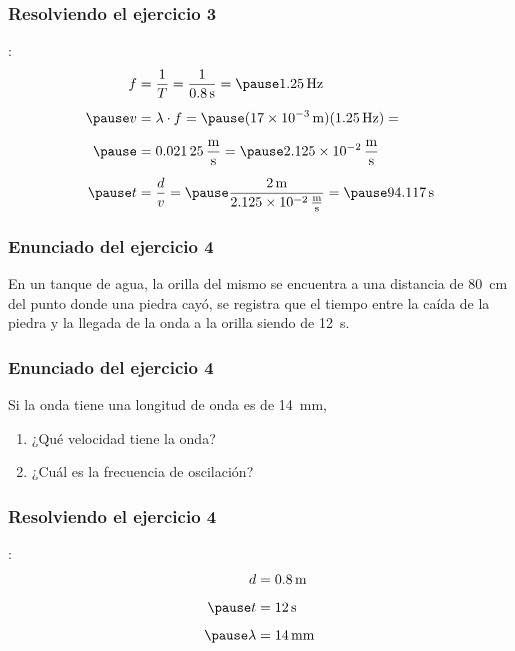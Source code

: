 \documentclass[14pt]{beamer}
\begin{document}
\begin{frame}
\frametitle{Resolviendo el ejercicio 3}
:
\begin{eqnarray*}
\begin{aligned}
f &= \dfrac{1}{T} = \dfrac{1}{\SI{0.8}{\second}} = \pause \SI{1.25}{\hertz} \\[0.5em] \pause
v &= \lambda \cdot f = \pause (\SI{17d-3}{\meter})(\SI{1.25}{\hertz}) = \\[0.5em] \pause
&= \SI[per-mode=fraction]{0.02125}{\meter\per\second} = \pause \SI[per-mode=fraction]{2.125d-2}{\meter\per\second} \\[0.5em] \pause
t &= \dfrac{d}{v} = \pause \dfrac{\SI{2}{\meter}}{\SI[per-mode=fraction]{2.125d-2}{\meter\per\second}} = \pause \SI{94.117}{\second}
\end{aligned}
\end{eqnarray*}
\end{frame}
\begin{frame}
\frametitle{Enunciado del ejercicio 4}
En un tanque de agua, la orilla del mismo se encuentra a una distancia de \SI{80}{\centi\meter} del punto donde una piedra cayó, \pause se registra que el tiempo entre la caída de la piedra y la llegada de la onda a la orilla siendo de \SI{12}{\second}.
\end{frame}
\begin{frame}
\frametitle{Enunciado del ejercicio 4}
Si la onda tiene una longitud de onda es de \SI{14}{\milli\meter},
\\
\bigskip
\pause
{}
\begin{enumerate}[<+->]
\item ¿Qué velocidad tiene la onda?
\item ¿Cuál es la frecuencia de oscilación?
\end{enumerate}
\end{frame}
\begin{frame}
\frametitle{Resolviendo el ejercicio 4}
:
\pause
\begin{eqnarray*}
\begin{aligned}
d &= \SI{0.8}{\meter} \\[0.5em] \pause
t &= \SI{12}{\second} \\[0.5em] \pause
\lambda &= \SI{14}{\milli\meter}
\end{aligned}
\end{eqnarray*}
\end{frame}
\end{document}
